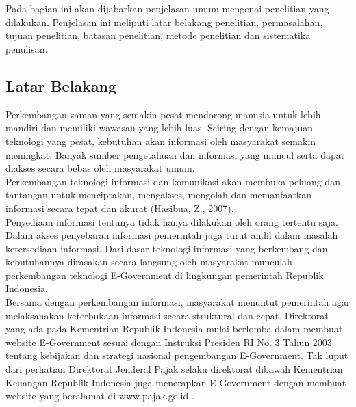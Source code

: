 \chapter{\babSatu}

Pada bagian ini akan dijabarkan penjelasan umum mengenai penelitian yang dilakukan. Penjelasan ini meliputi latar belakang penelitian, permasalahan, tujuan penelitian, batasan penelitian, metode penelitian dan sistematika penulisan.

\section{Latar Belakang}
Perkembangan zaman yang semakin pesat mendorong manusia untuk lebih mandiri dan memiliki wawasan yang lebih luas. Seiring dengan kemajuan teknologi yang pesat, kebutuhan akan informasi oleh masyarakat semakin meningkat. Banyak sumber pengetahuan dan informasi yang muncul serta dapat diakses secara bebas oleh masyarakat umum.
\newline\\
Perkembangan teknologi informasi dan komunikasi akan membuka peluang dan tantangan untuk menciptakan, mengakses, mengolah dan memanfaatkan informasi secara tepat dan akurat (Hasibua, Z., 2007).  
\newline\\
Penyediaan informasi tentunya tidak hanya dilakukan oleh orang tertentu saja. Dalam akses penyebaran informasi pemerintah juga turut andil dalam masalah ketersediaan informasi. Dari dasar teknologi informasi yang berkembang dan kebutuhannya dirasakan secara langsung oleh masyarakat munculah perkembangan teknologi E-Government di lingkungan pemerintah Republik Indonesia. 
\newline\\
Bersama dengan perkembangan informasi, masyarakat menuntut pemerintah agar melaksanakan keterbukaan informasi secara struktural dan cepat. Direktorat yang ada pada Kementrian Republik Indonesia mulai berlomba dalam membuat website E-Government sesuai dengan Instruksi Presiden RI No. 3 Tahun 2003 tentang kebijakan dan strategi nasional pengembangan E-Government. Tak luput dari perhatian Direktorat Jenderal Pajak selaku direktorat dibawah Kementrian Keuangan Republik Indonesia juga menerapkan E-Government dengan membuat website yang beralamat di www.pajak.go.id . 

